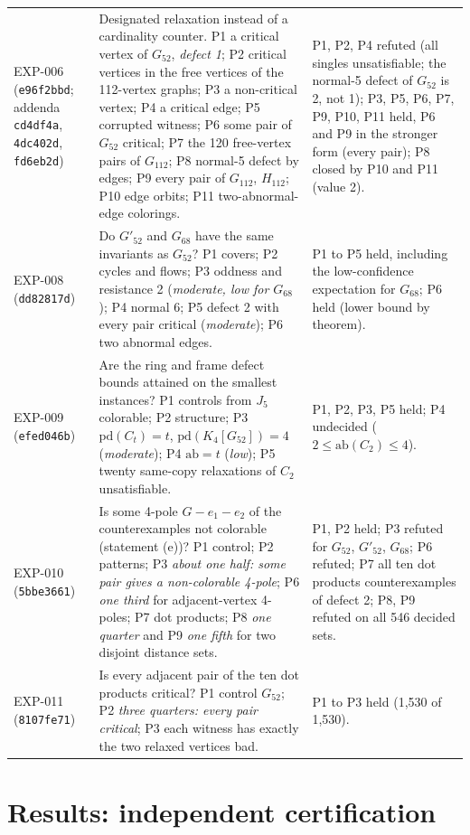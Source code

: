 \documentclass[11pt]{article}
\theoremstyle{definition}
\theoremstyle{remark}
\newcommand{\Gmain}{G_{112}}
\newcommand{\Gsym}{H_{112}}
\newcommand{\Gfty}{G_{52}}
\newcommand{\Gftyb}{G'_{52}}
\newcommand{\Gsix}{G_{68}}
\newcommand{\pd}{\mathrm{pd}}
\newcommand{\ab}{\mathrm{ab}}
\begin{document}
{\begin{longtable}{>{\raggedright\arraybackslash}p{2.0cm}>{\raggedright\arraybackslash}p{6.2cm}>{\raggedright\arraybackslash}p{6.0cm}}
EXP-006 (\texttt{e96f2bbd}; addenda \texttt{cd4df4a}, \texttt{4dc402d}, \texttt{fd6eb2d}) & Designated relaxation instead of a cardinality counter. P1 a critical vertex of $\Gfty$, \emph{defect 1}; P2 critical vertices in the free vertices of the 112-vertex graphs; P3 a non-critical vertex; P4 a critical edge; P5 corrupted witness; P6 some pair of $\Gfty$ critical; P7 the 120 free-vertex pairs of $\Gmain$; P8 normal-5 defect by edges; P9 every pair of $\Gmain$, $\Gsym$; P10 edge orbits; P11 two-abnormal-edge colorings. & P1, P2, P4 refuted (all singles unsatisfiable; the normal-5 defect of $\Gfty$ is 2, not 1); P3, P5, P6, P7, P9, P10, P11 held, P6 and P9 in the stronger form (every pair); P8 closed by P10 and P11 (value 2).\\
EXP-008 (\texttt{dd82817d}) & Do $\Gftyb$ and $\Gsix$ have the same invariants as $\Gfty$? P1 covers; P2 cycles and flows; P3 oddness and resistance 2 (\emph{moderate, low for $\Gsix$}); P4 normal 6; P5 defect 2 with every pair critical (\emph{moderate}); P6 two abnormal edges. & P1 to P5 held, including the low-confidence expectation for $\Gsix$; P6 held (lower bound by theorem).\\
EXP-009 (\texttt{efed046b}) & Are the ring and frame defect bounds attained on the smallest instances? P1 controls from $J_5$ colorable; P2 structure; P3 $\pd(C_t) = t$, $\pd(K_4[\Gfty]) = 4$ (\emph{moderate}); P4 $\ab = t$ (\emph{low}); P5 twenty same-copy relaxations of $C_2$ unsatisfiable. & P1, P2, P3, P5 held; P4 undecided ($2 \le \ab(C_2) \le 4$).\\
EXP-010 (\texttt{5bbe3661}) & Is some 4-pole $G - e_1 - e_2$ of the counterexamples not colorable (statement (e))? P1 control; P2 patterns; P3 \emph{about one half: some pair gives a non-colorable 4-pole}; P6 \emph{one third} for adjacent-vertex 4-poles; P7 dot products; P8 \emph{one quarter} and P9 \emph{one fifth} for two disjoint distance sets. & P1, P2 held; P3 refuted for $\Gfty$, $\Gftyb$, $\Gsix$; P6 refuted; P7 all ten dot products counterexamples of defect 2; P8, P9 refuted on all 546 decided sets.\\
EXP-011 (\texttt{8107fe71}) & Is every adjacent pair of the ten dot products critical? P1 control $\Gfty$; P2 \emph{three quarters: every pair critical}; P3 each witness has exactly the two relaxed vertices bad. & P1 to P3 held (1{,}530 of 1{,}530).\\
\end{longtable}}

\section{Results: independent certification}\label{sec:certify}
\end{document}

